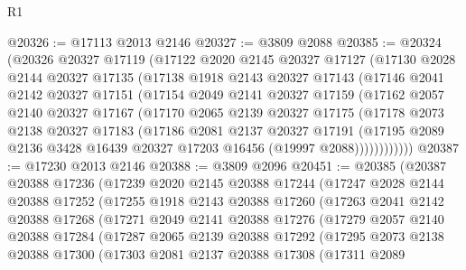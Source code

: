 \begin{lexlean}{R1}
\begin{coremodule}
@20326 := @17113 @2013 @2146
@20327 := @3809 @2088
@20385 := @20324
    (@20326
      @20327
      @17119
      (@17122
        @2020
        @2145
        @20327
        @17127
        (@17130
          @2028
          @2144
          @20327
          @17135
          (@17138
            @1918
            @2143
            @20327
            @17143
            (@17146
              @2041
              @2142
              @20327
              @17151
              (@17154
                @2049
                @2141
                @20327
                @17159
                (@17162
                  @2057
                  @2140
                  @20327
                  @17167
                  (@17170
                    @2065
                    @2139
                    @20327
                    @17175
                    (@17178
                      @2073
                      @2138
                      @20327
                      @17183
                      (@17186
                        @2081
                        @2137
                        @20327
                        @17191
                        (@17195
                          @2089
                          @2136
                          @3428
                          @16439
                          @20327
                          @17203
                          @16456
                          (@19997 @2088))))))))))))
@20387 := @17230 @2013 @2146
@20388 := @3809 @2096
@20451 := @20385
    (@20387
      @20388
      @17236
      (@17239
        @2020
        @2145
        @20388
        @17244
        (@17247
          @2028
          @2144
          @20388
          @17252
          (@17255
            @1918
            @2143
            @20388
            @17260
            (@17263
              @2041
              @2142
              @20388
              @17268
              (@17271
                @2049
                @2141
                @20388
                @17276
                (@17279
                  @2057
                  @2140
                  @20388
                  @17284
                  (@17287
                    @2065
                    @2139
                    @20388
                    @17292
                    (@17295
                      @2073
                      @2138
                      @20388
                      @17300
                      (@17303
                        @2081
                        @2137
                        @20388
                        @17308
                        (@17311
                          @2089

\end{coremodule}
\end{lexlean}

